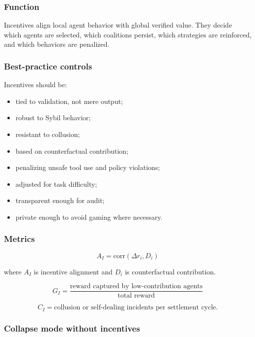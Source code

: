 \subsubsection{Function}\label{function-3}

Incentives align local agent behavior with global verified value. They
decide which agents are selected, which coalitions persist, which
strategies are reinforced, and which behaviors are penalized.

\subsubsection{Best-practice controls}\label{best-practice-controls-3}

Incentives should be:

\begin{itemize}
\tightlist
\item
  tied to validation, not mere output;
\item
  robust to Sybil behavior;
\item
  resistant to collusion;
\item
  based on counterfactual contribution;
\item
  penalizing unsafe tool use and policy violations;
\item
  adjusted for task difficulty;
\item
  transparent enough for audit;
\item
  private enough to avoid gaming where necessary.
\end{itemize}

\subsubsection{Metrics}\label{metrics-3}

\[
A_I=\text{corr}(\Delta r_i,D_i)
\]

where \(A_I\) is incentive alignment and \(D_i\) is counterfactual
contribution.

\[
G_I=\frac{\text{reward captured by low-contribution agents}}{\text{total reward}}
\]

\[
C_I=\text{collusion or self-dealing incidents per settlement cycle}.
\]

\subsubsection{Collapse mode without
incentives}\label{collapse-mode-without-incentives}

